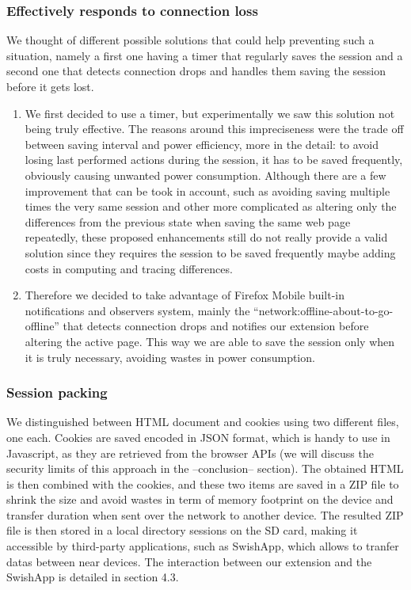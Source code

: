 \documentclass[11pt,a4paper]{article}
\begin{document}
\subsubsection{Effectively responds to connection loss}
We thought of different possible solutions that could help preventing such a situation, namely a first one having a timer that regularly saves the session and a second one that detects connection drops and handles them saving the session before it gets lost.
\begin{enumerate}
	\item We first decided to use a timer, but experimentally we saw this solution not being truly effective.
	The reasons around this impreciseness were the trade off between saving interval and power efficiency, more in the detail: to avoid losing last performed actions during the session, it has to be saved frequently, obviously causing unwanted power consumption. Although there are a few improvement that can be took in account, such as avoiding saving multiple times the very same session and other more complicated as altering only the differences from the previous state when saving the same web page repeatedly, these proposed enhancements still do not really provide a valid solution since they requires the session to be saved frequently maybe adding costs in computing and tracing differences.

	\item Therefore we decided to take advantage of Firefox Mobile built-in notifications and observers system, mainly the “network:offline-about-to-go-offline” that detects connection drops and notifies our extension before altering the active page. This way we are able to save the session only when it is truly necessary, avoiding wastes in power consumption.
\end{enumerate}

\subsubsection{Session packing}
We distinguished between HTML document and cookies using two different files, one each. Cookies are saved encoded in JSON format, which is handy to use in Javascript, as they are retrieved from the browser APIs (we will discuss the security limits of this approach in the --conclusion-- section).
The obtained HTML is then combined with the cookies, and these two items are saved in a ZIP file to shrink the size and avoid wastes in term of memory footprint on the device and transfer duration when sent over the network to another device.
The resulted ZIP file is then stored in a local directory sessions on the SD card, making it accessible by third-party applications, such as SwishApp, which allows to tranfer datas between near devices. The interaction between our extension and the SwishApp is detailed in section 4.3.
\end{document}
